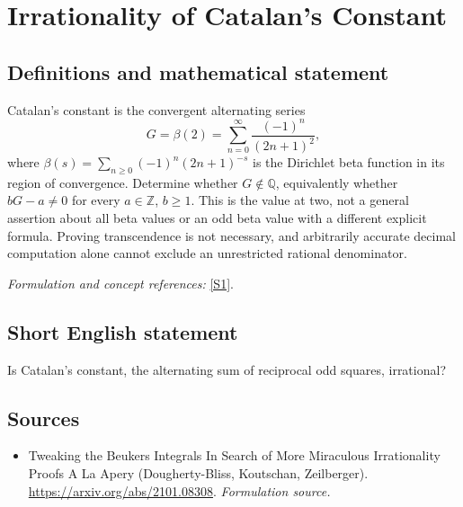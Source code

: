 \documentclass[11pt]{article}
\begin{document}
\section*{\texorpdfstring{Irrationality of Catalan’s Constant}{Irrationality of Catalan’s Constant}}\label{30005093}
\subsection{Definitions and mathematical statement}
Catalan's constant is the convergent alternating series
\[
 G=\beta(2)=\sum_{n=0}^{\infty}\frac{(-1)^n}{(2n+1)^2},
\]
where $\beta(s)=\sum_{n\ge0}(-1)^n(2n+1)^{-s}$ is the Dirichlet beta function in its region of convergence. Determine whether $G\notin{\mathbb{Q}}$, equivalently whether $bG-a\ne0$ for every $a\in{\mathbb{Z}}$, $b\ge1$. This is the value at two, not a general assertion about all beta values or an odd beta value with a different explicit formula. Proving transcendence is not necessary, and arbitrarily accurate decimal computation alone cannot exclude an unrestricted rational denominator.
\par\smallskip\textit{Formulation and concept references:} \href{https://arxiv.org/abs/2101.08308}{[S1]}.

\subsection{Short English statement}
Is Catalan's constant, the alternating sum of reciprocal odd squares, irrational?
\subsection{Sources}
\begin{itemize}
\item[S1]Tweaking the Beukers Integrals In Search of More Miraculous Irrationality Proofs A La Apery (Dougherty-Bliss, Koutschan, Zeilberger).
\url{https://arxiv.org/abs/2101.08308}.
\textit{Formulation source.}
\end{itemize}
\end{document}
